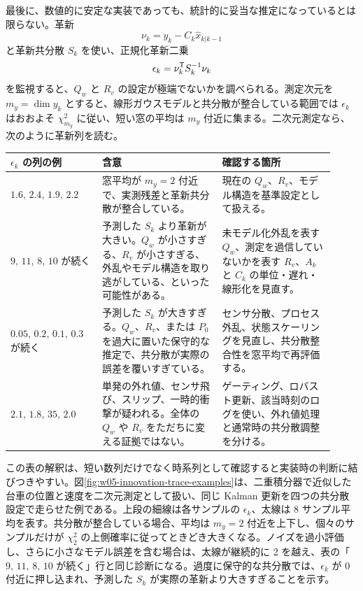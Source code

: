 最後に、数値的に安定な実装であっても、統計的に妥当な推定になっているとは限らない。革新
\begin{equation}
  \nu_k=y_k-C_k\hat{x}_{k|k-1}
\end{equation}
と革新共分散 $S_k$ を使い、正規化革新二乗
\begin{equation}
  \epsilon_k=\nu_k^{\mathsf{T}} S_k^{-1}\nu_k
\end{equation}
を監視すると、$Q_w$ と $R_v$ の設定が極端でないかを調べられる。測定次元を $m_y=\dim y_k$ とすると、線形ガウスモデルと共分散が整合している範囲では $\epsilon_k$ はおおよそ $\chi^2_{m_y}$ に従い、短い窓の平均は $m_y$ 付近に集まる。二次元測定なら、次のように革新列を読む。
\begin{center}
\small
\begin{tabular}{@{}p{0.26\linewidth}p{0.34\linewidth}p{0.32\linewidth}@{}}
\hline
$\epsilon_k$ の列の例 & 含意 & 確認する箇所 \\
\hline
$1.6,\,2.4,\,1.9,\,2.2$ & 窓平均が $m_y=2$ 付近で、実測残差と革新共分散が整合している。 & 現在の $Q_w$、$R_v$、モデル構造を基準設定として扱える。 \\
$9,\,11,\,8,\,10$ が続く & 予測した $S_k$ より革新が大きい。$Q_w$ が小さすぎる、$R_v$ が小さすぎる、外乱やモデル構造を取り逃がしている、といった可能性がある。 & 未モデル化外乱を表す $Q_w$、測定を過信していないかを表す $R_v$、$A_k$ と $C_k$ の単位・遅れ・線形化を見直す。 \\
$0.05,\,0.2,\,0.1,\,0.3$ が続く & 予測した $S_k$ が大きすぎる。$Q_w$、$R_v$、または $P_0$ を過大に置いた保守的な推定で、共分散が実際の誤差を覆いすぎている。 & センサ分散、プロセス外乱、状態スケーリングを見直し、共分散整合性を窓平均で再評価する。 \\
$2.1,\,1.8,\,35,\,2.0$ & 単発の外れ値、センサ飛び、スリップ、一時的衝撃が疑われる。全体の $Q_w$ や $R_v$ をただちに変える証拠ではない。 & ゲーティング、ロバスト更新、該当時刻のログを使い、外れ値処理と通常時の共分散調整を分ける。 \\
\hline
\end{tabular}
\end{center}
この表の解釈は、短い数列だけでなく時系列として確認すると実装時の判断に結びつきやすい。図\ref{fig:w05-innovation-trace-examples}は、二重積分器で近似した台車の位置と速度を二次元測定として扱い、同じ Kalman 更新を四つの共分散設定で走らせた例である。上段の細線は各サンプルの $\epsilon_k$、太線は 8 サンプル平均を表す。共分散が整合している場合、平均は $m_y=2$ 付近を上下し、個々のサンプルだけが $\chi^2_2$ の上側確率に従ってときどき大きくなる。ノイズを過小評価し、さらに小さなモデル誤差を含む場合は、太線が継続的に 2 を越え、表の「$9,\,11,\,8,\,10$ が続く」行と同じ診断になる。過度に保守的な共分散では、$\epsilon_k$ が 0 付近に押し込まれ、予測した $S_k$ が実際の革新より大きすぎることを示す。

